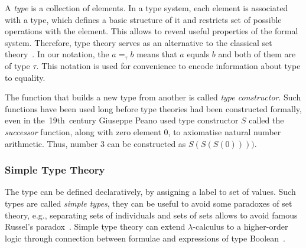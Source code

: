 \documentclass[article]{aaltoseries}
\begin{document}
A \textit{type} is a collection of elements. In a type system, each element is associated with a type, which defines a basic structure of it and restricts set of possible operations with the element. This allows to reveal useful properties of the formal system. Therefore, type theory serves as an alternative to the classical set theory~\cite{Tho91}.
In our notation, the $a =_{\tau} b$ means that $a$ equals $b$ and both of them are of type $\tau$. This notation is used for convenience to encode information about type to equality.

The function that builds a new type from another is called \textit{type constructor}. Such functions have been used long before type theories had been constructed formally, even in the~19th~century Giuseppe Peano used type constructor $S$ called the \textit{successor} function, along with zero element 0, to axiomatise natural number arithmetic. Thus, number 3 can be constructed as $S(S(S(0))))$.


\subsubsection{Simple Type Theory}
The type can be defined declaratively, by assigning a label to set of values. Such types are called \textit{simple types}, they can be useful to avoid some paradoxes of set theory, e.g., separating sets of individuals and sets of sets allows to avoid famous Russel's paradox~\cite{Irv95}. Simple type theory can extend $\lambda$-calculus to a higher-order logic through connection between formulae and expressions of type Boolean~\cite{Paulson90}.



\end{document}
